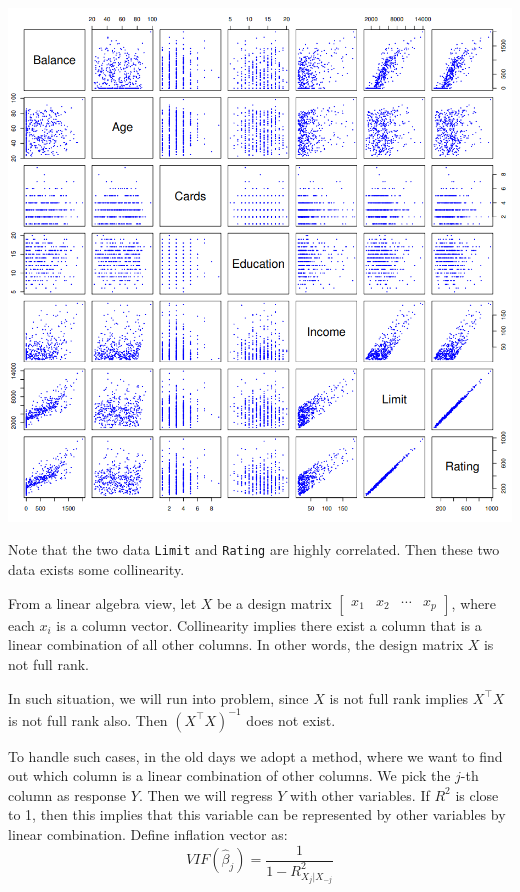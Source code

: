 \documentclass{article}
\theoremstyle{MyNonumberplain}
\theoremstyle{break}
\newcommand{\T}{^\intercal}
\newcommand{\inv}{^{-1}}
\theoremstyle{break}
\begin{document}
\begin{center}
    \includegraphics*[scale=0.25]{Images/img13.png}
\end{center}

Note that the two data \texttt{Limit} and \texttt{Rating} are highly correlated. Then these two data exists some collinearity.

From a linear algebra view, let $X$ be a design matrix 
$\begin{bmatrix}
    x_1 & x_2 & \cdots & x_p
\end{bmatrix}$, where each $x_i$ is a column vector. 
Collinearity implies there exist a column that is a linear combination of all other columns.
In other words, the design matrix $X$ is not full rank.

In such situation, we will run into problem, since $X$ is not full rank implies $X\T X$ is not full rank also.
Then $(X\T X)\inv$ does not exist. 

To handle such cases, in the old days we adopt a method, where we want to find out which column is
a linear combination of other columns. We pick the $j$-th column as response $Y$. Then we will regress $Y$ with
other variables. If $R^2$ is close to 1, then this implies that this variable can be represented by other variables 
by linear combination. Define inflation vector as:
$$
VIF(\hat\beta_j)=\frac{1}{1-R^2_{X_j|X_{-j}}}
$$
\end{document}
